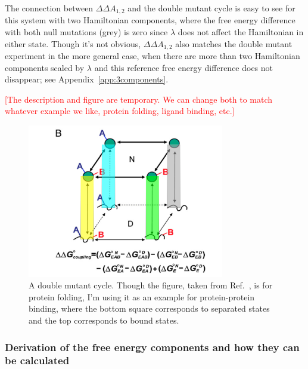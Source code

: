 \documentclass{article}
\newcommand{\warning}[1]{{\textsf{{\textcolor{red}{{[#1]}{}}}}}}
\begin{document}
The connection between $\Delta \Delta A_{1,2}$ and the double mutant cycle is easy to see for this system with two Hamiltonian components, where the free energy difference with both null mutations (grey) is zero since $\lambda$ does not affect the Hamiltonian in either state.  Though it's not obvious, $\Delta \Delta A_{1,2}$ also matches the double mutant experiment in the more general case, when there are more than two Hamiltonian components scaled by $\lambda$ and this reference free energy difference does not disappear; see Appendix~\ref{app:3components}. 

\warning{The description and figure are temporary. We can change both to match whatever example we like, protein folding, ligand binding, etc.}

\begin{figure}
 \centering
  \includegraphics[width=8.6cm]{doubleMutantColors.png}
\caption{\label{f:DoubleMutant}{ A double mutant cycle. Though the figure, taken from Ref.~\cite{Cho:2014fl}, is for protein folding, I'm using it as an example for protein-protein binding, where the bottom square corresponds to separated states and the top corresponds to bound states.  }}
\end{figure}


\subsubsection{Derivation of the free energy components and how they can be calculated}
\label{sec:ComponentDerivation}
\end{document}
